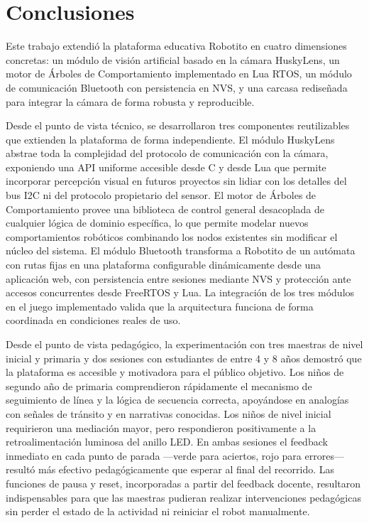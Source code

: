 \documentclass{prgrado}
\begin{document}
\section{Conclusiones}

Este trabajo extendió la plataforma educativa Robotito en cuatro dimensiones concretas: un módulo de visión artificial basado en la cámara HuskyLens, un motor de Árboles de Comportamiento implementado en Lua RTOS, un módulo de comunicación Bluetooth con persistencia en NVS, y una carcasa rediseñada para integrar la cámara de forma robusta y reproducible.

Desde el punto de vista técnico, se desarrollaron tres componentes reutilizables que extienden la plataforma de forma independiente. El módulo HuskyLens abstrae toda la complejidad del protocolo de comunicación con la cámara, exponiendo una API uniforme accesible desde C y desde Lua que permite incorporar percepción visual en futuros proyectos sin lidiar con los detalles del bus I2C ni del protocolo propietario del sensor. El motor de Árboles de Comportamiento provee una biblioteca de control general desacoplada de cualquier lógica de dominio específica, lo que permite modelar nuevos comportamientos robóticos combinando los nodos existentes sin modificar el núcleo del sistema. El módulo Bluetooth transforma a Robotito de un autómata con rutas fijas en una plataforma configurable dinámicamente desde una aplicación web, con persistencia entre sesiones mediante NVS y protección ante accesos concurrentes desde FreeRTOS y Lua. La integración de los tres módulos en el juego implementado valida que la arquitectura funciona de forma coordinada en condiciones reales de uso.

Desde el punto de vista pedagógico, la experimentación con tres maestras de nivel inicial y primaria y dos sesiones con estudiantes de entre 4 y 8 años demostró que la plataforma es accesible y motivadora para el público objetivo. Los niños de segundo año de primaria comprendieron rápidamente el mecanismo de seguimiento de línea y la lógica de secuencia correcta, apoyándose en analogías con señales de tránsito y en narrativas conocidas. Los niños de nivel inicial requirieron una mediación mayor, pero respondieron positivamente a la retroalimentación luminosa del anillo LED. En ambas sesiones el feedback inmediato en cada punto de parada ---verde para aciertos, rojo para errores--- resultó más efectivo pedagógicamente que esperar al final del recorrido. Las funciones de pausa y reset, incorporadas a partir del feedback docente, resultaron indispensables para que las maestras pudieran realizar intervenciones pedagógicas sin perder el estado de la actividad ni reiniciar el robot manualmente.
\end{document}
